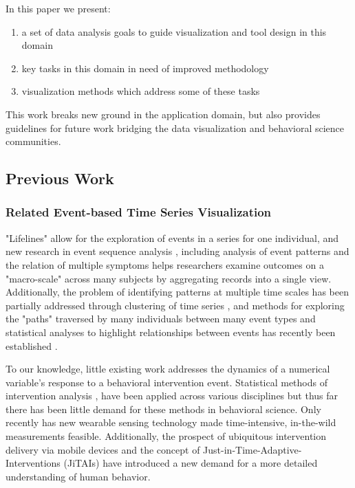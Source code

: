\documentclass[review,journal]{vgtc}         %
\newcommand{\comment}[1]{}  %
\begin{document}
In this paper we present:
\begin{enumerate}
  \item{a set of data analysis goals to guide visualization and tool design in this domain}
  \item{key tasks in this domain in need of improved methodology}
  \item{visualization methods which address some of these tasks}
\end{enumerate}

\comment{
  - to understand how we can use this type of data to accomplish these domain-specific tasks?
  - to propose new hypotheses and techniques to support these tasks?
  - to propose lessons learned that may apply for similar viz problems.
}

This work breaks new ground in the application domain, but also provides guidelines for future work bridging the data visualization and behavioral science communities.

\subsection{Previous Work}
\subsubsection{Related Event-based Time Series Visualization}
"Lifelines" \cite{plaisant1996} allow for the exploration of events in a series for one individual, and new research in event sequence analysis \cite{Wongsuphasawat2011}, including analysis of event patterns \cite{Wongsuphasawat2012, fails2006, vrotsou2007} and the relation of multiple symptoms \cite{wongsuphasawat2011outflow} helps researchers examine outcomes on a "macro-scale" across many subjects by aggregating records into a single view. 
Additionally, the problem of identifying patterns at multiple time scales has been partially addressed through clustering of time series \cite{van1999}, and methods for exploring the "paths" traversed by many individuals between many event types and statistical analyses to highlight relationships between events has recently been established \cite{gotz2014}.

To our knowledge, little existing work addresses the dynamics of a numerical variable's response to a behavioral intervention event. 
Statistical methods of intervention analysis \cite{box1975}, have been applied across various disciplines but thus far there has been little demand for these methods in behavioral science.
Only recently has new wearable sensing technology made time-intensive, in-the-wild measurements feasible.
Additionally, the prospect of ubiquitous intervention delivery via mobile devices and the concept of Just-in-Time-Adaptive-Interventions (JiTAIs) have introduced a new demand for a more detailed understanding of human behavior.
\end{document}
